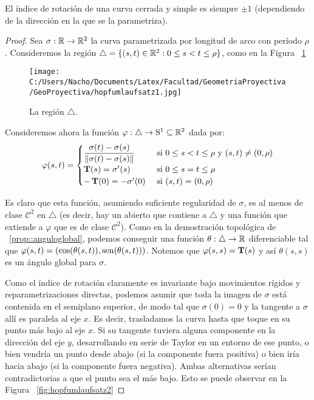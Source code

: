 \begin{teo}[Hopf]
\label{teo::hopfumlaufsatz}
El índice de rotación de una curva cerrada y simple es siempre $\pm 1$ (dependiendo de la dirección en la que se la parametriza).
\begin{proof}
Sea $\sigma:\mathbb{R}\to\mathbb{R}^2$ la curva parametrizada por longitud de arco con período $\rho$. Consideremos la región $\triangle = \{(s,t)\in\mathbb{R}^2 : 0\leq s<t\leq \rho\}$, como en la Figura ~\ref{fig:hopfumlaufsatz1}

\begin{figure}[h]
	\centering
		\texttt{[image: C:/Users/Nacho/Documents/Latex/Facultad/GeometriaProyectiva/GeoProyectiva/hopfumlaufsatz1.jpg]}
	\caption{La región $\triangle$.}
	\label{fig:hopfumlaufsatz1}
\end{figure}

Consideremos ahora la función $\varphi:\triangle\to\mathrm{S}^1\subseteq\mathbb{R}^2$ dada por: $$\varphi(s,t)=\begin{cases}\dfrac{\sigma(t)-\sigma(s)}{\left\| \sigma(t)-\sigma(s) \right\|} &\text{ si }0\leq s< t\leq \rho \text{ y } (s,t)\neq(0,\rho) \\ \operatorname{\mathbf{T}}(s)=\sigma'(s) &\text{ si }0\leq s=t\leq\rho \\ -\operatorname{\mathbf{T}}(0)=-\sigma'(0)&\text{ si }(s,t)=(0,\rho)\end{cases}$$

Es claro que esta función, asumiendo suficiente regularidad de $\sigma$, es al menos de clase $\mathscr{C}^2$ en $\triangle$ (es decir, hay un abierto que contiene a $\triangle$ y una función que extiende a $\varphi$ que es de clase $\mathscr{C}^2$). Como en la demostración topológica de ~\ref{prop::anguloglobal}, podemos conseguir una función $\theta:\triangle\to\mathbb{R}$ diferenciable tal que $\varphi(s,t)=(\cos(\theta(s,t)),\operatorname{sen}(\theta(s,t)))$. Notemos que $\varphi(s,s)=\operatorname{\mathbf{T}}(s)$ y así $\theta(s,s)$ es un ángulo global para $\sigma$. 

Como el índice de rotación claramente es invariante bajo movimientos rígidos y reparametrizaciones directas, podemos asumir que toda la imagen de $\sigma$ está contenida en el semiplano superior, de modo tal que $\sigma(0)=0$ y la tangente a $\sigma$ allí es paralela al eje $x$. Es decir, trasladamos la curva hasta que toque en su punto más bajo al eje $x$. Si su tangente tuviera alguna componente en la dirección del eje $y$, desarrollando en serie de Taylor en un entorno de ese punto, o bien vendría un punto desde abajo (si la componente fuera positiva) o bien iría hacia abajo (si la componente fuera negativa). Ambas alternativas serían contradictorias a que el punto sea el más bajo. Esto se puede observar en la Figura ~\ref{fig:hopfumlaufsatz2}


\end{proof}
\end{teo}
